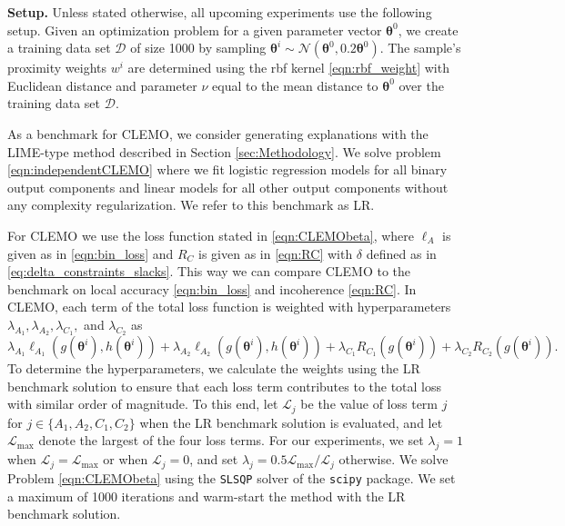 \documentclass{article}
\theoremstyle{plain}
\theoremstyle{definition}
\theoremstyle{remark}
\begin{document}
\textbf{Setup.} Unless stated otherwise, all upcoming experiments use the following setup. Given an optimization problem for a given parameter vector $\bm{\theta}^0$, we create a training data set $\mathcal{D}$ of size 1000 by sampling $\bm{\theta}^i\sim \mathcal{N}(\bm{\theta}^0, 0.2\bm{\theta}^0)$. The sample's proximity weights $w^i$ are determined using the rbf kernel \eqref{eqn:rbf_weight} with Euclidean distance and parameter $\nu$ equal to the mean distance to $\bm{\theta}^0$ over the training data set $\mathcal{D}$. 

As a benchmark for CLEMO, we consider generating explanations with the LIME-type method described in Section \ref{sec:Methodology}. We solve problem \eqref{eqn:independentCLEMO} where we fit logistic regression models for all binary output components and linear models for all other output components without any complexity regularization. We refer to this benchmark as LR.

For CLEMO we use the loss function stated in \eqref{eqn:CLEMObeta}, where $\ell_A$ is given as in \eqref{eqn:bin_loss} and $R_C$ is given as in \eqref{eqn:RC} with $\delta$ defined as in \eqref{eq:delta_constraints_slacks}. This way we can compare CLEMO to the benchmark on local accuracy \eqref{eqn:bin_loss} and incoherence \eqref{eqn:RC}. In CLEMO, each term of the total loss function is weighted with hyperparameters $\lambda_{A_1}, \lambda_{A_2}, \lambda_{C_1},$ and $\lambda_{C_2}$ as 
\[
    \lambda_{A_1}\ell_{A_1}(g(\bm{\theta}^i), h(\bm{\theta}^i)) + \lambda_{A_2}\ell_{A_2}(g(\bm{\theta}^i), h(\bm{\theta}^i))
    + \lambda_{C_1}R_{C_1}(g(\bm{\theta}^i))+ \lambda_{C_2}R_{C_2}(g(\bm{\theta}^i)).
\]
To determine the hyperparameters, we calculate the weights using the LR benchmark solution to ensure that each loss term contributes to the total loss with similar order of magnitude. To this end, let $\mathcal{L}_j$ be the value of loss term $j$ for $j\in\{A_1,A_2,C_1,C_2\}$ when the LR benchmark solution is evaluated, and let $\mathcal{L}_{\max}$ denote the largest of the four loss terms. For our experiments, we set $\lambda_j=1$ when $\mathcal{L}_j=\mathcal{L}_{\max}$ or when $\mathcal{L}_j=0$, and set $\lambda_j = 0.5  \mathcal{L}_{\max}/ \mathcal{L}_j$ otherwise. 
We solve Problem \eqref{eqn:CLEMObeta} using the \texttt{SLSQP} solver of the \texttt{scipy} package. We set a maximum of 1000 iterations and warm-start the method with the LR benchmark solution. 

\end{document}
